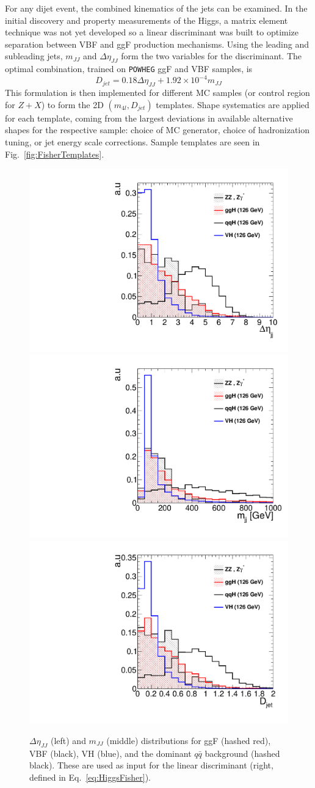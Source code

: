 For any dijet event, the combined kinematics of the jets can be examined. In the initial discovery and property measurements of the Higgs, a matrix element technique was not yet developed so a linear discriminant \cite{} was built to optimize separation between VBF and ggF production mechanisms. Using the leading and subleading jets, $m_{JJ}$ and $\Delta\eta_{JJ}$ form the two variables for the discriminant. The optimal combination, trained on {\tt POWHEG} ggF and VBF samples, is
\begin{equation} \label{eq:HiggsFisher}
D_{jet} = 0.18\Delta\eta_{JJ} + 1.92\times10^{-4}m_{JJ}
\end{equation}
This formulation is then implemented for different MC samples (or control region for $Z+X$) to form the 2D $(m_{4l},D_{jet})$ templates. Shape systematics are applied for each template, coming from the largest deviations in available alternative shapes for the respective sample: choice of MC generator, choice of hadronization tuning, or jet energy scale corrections. Sample templates are seen in Fig.~\ref{fig:FisherTemplates}.

\begin{figure}[htbp]
\begin{center}
\includegraphics[width=.3\linewidth]{HiggsDiscovery/figures/deta_shape.pdf}
\includegraphics[width=.3\linewidth]{HiggsDiscovery/figures/mjj_shape.pdf}
\includegraphics[width=.3\linewidth]{HiggsDiscovery/figures/djet_shape.pdf} \\
\caption[Jet Kinematic Shapes of Different Higgs Production Mechanisms]{$\Delta\eta_{JJ}$ (left) and $m_{JJ}$ (middle) distributions for ggF (hashed red), VBF (black), VH (blue), and the dominant $q\bar{q}$ background (hashed black). These are used as input for the linear discriminant (right, defined in Eq.~\ref{eq:HiggsFisher}).}
\label{fig:HiggsFisher}
\end{center}
\end{figure}

